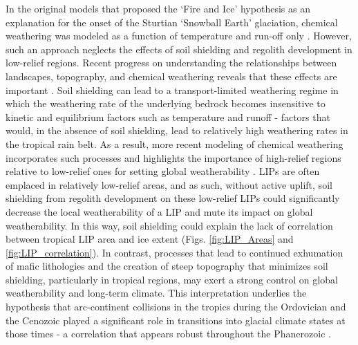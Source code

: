 \documentclass[11pt,letterpaper]{article}
\begin{document}
In the original models that proposed the `Fire and Ice' hypothesis as an explanation for the onset of the Sturtian `Snowball Earth' glaciation, chemical weathering was modeled as a function of temperature and run-off only \citep{Donnadieu2004a}. However, such an approach neglects the effects of soil shielding and regolith development in low-relief regions. Recent progress on understanding the relationships between landscapes, topography, and chemical weathering reveals that these effects are important \citep{Gabet2009a, Hartmann2014a, Maher2014a, Godderis2017b}. Soil shielding can lead to a transport-limited weathering regime in which the weathering rate of the underlying bedrock becomes insensitive to kinetic and equilibrium factors such as temperature and runoff - factors that would, in the absence of soil shielding, lead to relatively high weathering rates in the tropical rain belt. As a result, more recent modeling of chemical weathering incorporates such processes and highlights the importance of high-relief regions relative to low-relief ones for setting global weatherability \citep{West2012a, Godderis2017b}. LIPs are often emplaced in relatively low-relief areas, and as such, without active uplift, soil shielding from regolith development on these low-relief LIPs could significantly decrease the local weatherability of a LIP and mute its impact on global weatherability. In this way, soil shielding could explain the lack of correlation between tropical LIP area and ice extent (Figs. \ref{fig:LIP_Areas} and \ref{fig:LIP_correlation}). In contrast, processes that lead to continued exhumation of mafic lithologies and the creation of steep topography that minimizes soil shielding, particularly in tropical regions, may exert a strong control on global weatherability and long-term climate. This interpretation underlies the hypothesis that arc-continent collisions in the tropics during the Ordovician \citep{Swanson-Hysell2017a} and the Cenozoic \citep{Jagoutz2016a} played a significant role in transitions into glacial climate states at those times - a correlation that appears robust throughout the Phanerozoic \citep{Macdonald2019a}.
\end{document}
